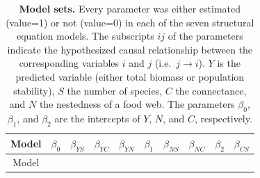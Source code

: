 \documentclass[11pt]{article}
\begin{document}
\hypertarget{tbl:models}{}
\begin{longtable}[]{@{}cccccccccc@{}}
\caption{\label{tbl:models}\textbf{Model sets.} Every parameter was
either estimated (value=1) or not (value=0) in each of the seven
structural equation models. The subscripts \({ij}\) of the parameters
indicate the hypothesized causal relationship between the corresponding
variables \(i\) and \(j\) (i.e.~\(j \rightarrow i\)). \(Y\) is the
predicted variable (either total biomass or population stability), \(S\)
the number of species, \(C\) the connectance, and \(N\) the nestedness
of a food web. The parameters \(\beta_0\), \(\beta_1\), and \(\beta_2\)
are the intercepts of \(Y\), \(N\), and \(C\),
respectively.}\tabularnewline
\toprule
\begin{minipage}[b]{0.15\columnwidth}\centering
Model\strut
\end{minipage} & \begin{minipage}[b]{0.07\columnwidth}\centering
\(\beta_0\)\strut
\end{minipage} & \begin{minipage}[b]{0.07\columnwidth}\centering
\(\beta_{YS}\)\strut
\end{minipage} & \begin{minipage}[b]{0.07\columnwidth}\centering
\(\beta_{YC}\)\strut
\end{minipage} & \begin{minipage}[b]{0.07\columnwidth}\centering
\(\beta_{YN}\)\strut
\end{minipage} & \begin{minipage}[b]{0.07\columnwidth}\centering
\(\beta_1\)\strut
\end{minipage} & \begin{minipage}[b]{0.07\columnwidth}\centering
\(\beta_{NS}\)\strut
\end{minipage} & \begin{minipage}[b]{0.07\columnwidth}\centering
\(\beta_{NC}\)\strut
\end{minipage} & \begin{minipage}[b]{0.07\columnwidth}\centering
\(\beta_2\)\strut
\end{minipage} & \begin{minipage}[b]{0.07\columnwidth}\centering
\(\beta_{CS}\)\strut
\end{minipage}\tabularnewline
\midrule
\endfirsthead
\toprule
\begin{minipage}[b]{0.15\columnwidth}\centering
Model\strut
\end{minipage} & \begin{minipage}[b]{0.07\columnwidth}\centering

\end{minipage}
\end{longtable}
\end{document}
